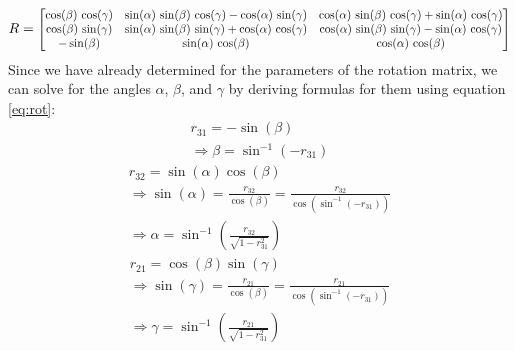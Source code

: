 \begin{equation} \label{eq:rot}
    R = \scalemath{0.85}{
        \begin{bmatrix}
            \cos(\beta)\,\cos(\gamma) & \sin(\alpha)\,\sin(\beta)\,\cos(\gamma) - \cos(\alpha)\,\sin(\gamma) & \cos(\alpha)\,\sin(\beta)\,\cos(\gamma) + \sin(\alpha)\,\cos(\gamma) \\
            \cos(\beta)\,\sin(\gamma) & \sin(\alpha)\,\sin(\beta)\,\sin(\gamma) + \cos(\alpha)\,\cos(\gamma) & \cos(\alpha)\,\sin(\beta)\,\sin(\gamma) - \sin(\alpha)\,\cos(\gamma) \\
            -\sin(\beta)              & \sin(\alpha)\,\cos(\beta)                                            & \cos(\alpha)\,\cos(\beta)
        \end{bmatrix}
    }
\end{equation}
Since we have already determined for the parameters of the rotation matrix, we can solve for the angles $\alpha$, $\beta$, and $\gamma$ by deriving formulas for them using equation \ref{eq:rot}:
\begin{gather}
    r_{31} = -\sin(\beta) \nonumber \\
    \Rightarrow \boxed{\beta = \sin^{-1}(-r_{31})}
\end{gather}
\begin{gather}
    r_{32} = \sin(\alpha)\cos(\beta) \nonumber \\
    \Rightarrow \sin(\alpha)  = \frac{r_{32}}{\cos(\beta)} = \frac{r_{32}}{\cos(\sin^{-1}(-r_{31}))} \nonumber \\
    \Rightarrow \boxed{\alpha = \sin^{-1}\left(\frac{r_{32}}{\sqrt{1-r_{31}^2}}\right)}
\end{gather}
\begin{gather}
    r_{21} = \cos(\beta)\sin(\gamma) \nonumber                                                                 \\
    \Rightarrow \sin(\gamma)  =\frac{r_{21}}{\cos(\beta)}  = \frac{r_{21}}{\cos(\sin^{-1}(-r_{31}))} \nonumber \\
    \Rightarrow \boxed{\gamma= \sin^{-1}\left(\frac{r_{21}}{\sqrt{1-r_{31}^2}}\right)}
\end{gather}
